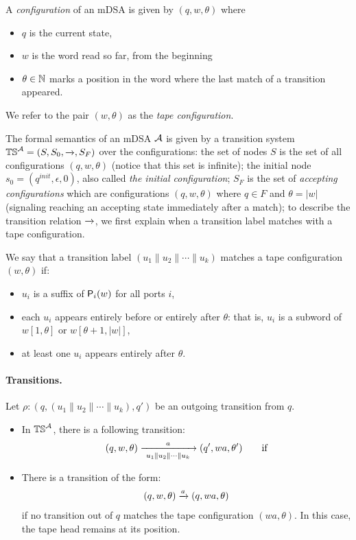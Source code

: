   A \emph{configuration} of an mDSA is given by $(q, w, \theta)$ where
  \begin{itemize}
  \item $q$ is the current state,
  \item $w$ is the word read so far, from the beginning
  \item $\theta \in \mathbb{N}$ marks a position in the word where the last match of a transition appeared.  
  \end{itemize} 
  We refer to the pair $(w, \theta)$ as the \emph{tape configuration}.
  
  The formal semantics of an mDSA $\mathcal{A}$ is given by a transition system $\mathbb{TS}^{\mathcal{A}} = (S, S_0, \xrightarrow{}, S_F)$  over the configurations: the set of nodes $S$ is  the set of all configurations $(q, w, \theta)$ (notice that this set is infinite); the initial node $s_0 = (q^{init}, \epsilon, 0)$, also called \emph{the initial configuration}; $S_F$  is the set of \emph{accepting configurations} which are configurations $(q, w, \theta)$ where $q \in F$ and $\theta = |w|$ (signaling reaching an accepting state immediately after a match); to describe the transition relation $\xrightarrow{}$, we first explain when a transition label matches with a tape configuration. 

  \begin{definition}\label{def:match}
    We say that a transition label $(u_1 \parallel u_2 \parallel \cdots \parallel u_k)$ matches a tape configuration $(w, \theta)$ if:
    \begin{itemize}
      \item $u_i$ is a suffix of $\mathsf{P}_{i}(w)$ for all ports $i$,
      \item each $u_i$ appears entirely before or entirely after $\theta$: that is, $u_i$ is a subword of $w[1, \theta]$ or $w[\theta+1, |w|]$,
      \item at least one $u_i$ appears entirely after $\theta$.
    \end{itemize}
  \end{definition}

\paragraph*{Transitions.} Let $\rho: (q, (u_1 \parallel u_2 \parallel \cdots \parallel u_k), q')$ be an outgoing transition from $q$. 
\begin{itemize}
\item In $\mathbb{TS}^{\mathcal{A}}$, there is a following transition:
\begin{align*}
 (q, w, \theta) \xrightarrow[~u_1 \parallel u_2 \parallel \cdots \parallel u_k~]{a} (q', wa, \theta') \qquad \text{if}
\end{align*}

\item There is a transition of the form:
\begin{align*}
  (q, w, \theta) \xrightarrow{a} (q, wa, \theta)
\end{align*}
if no transition out of $q$ matches the tape configuration $(wa, \theta)$. In this case, the tape head remains at its position.
\end{itemize} 

